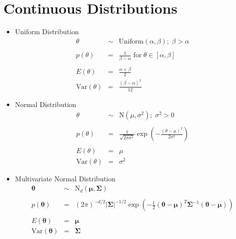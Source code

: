 \documentclass[10pt,a4paper]{article}
\begin{document}
\bigskip

\section*{Continuous Distributions}

\bigskip

\begin{itemize}
\item Uniform Distribution 
\begin{eqnarray*}
\theta &\sim& \mathrm{Uniform}(\alpha,\beta); \; \beta > \alpha \\\\
p(\theta) &=& \frac{1}{\beta - \alpha} \; \mathrm{for} \; \theta \in [\alpha,\beta] \\\\
E(\theta) &=& \frac{\alpha + \beta}{2} \\
\mathrm{Var}(\theta) &=& \frac{(\beta-\alpha)^2}{12}
\end{eqnarray*}

\bigskip

\item Normal Distribution 
\begin{eqnarray*}
\theta &\sim& \mathrm{N}(\mu, \sigma^2); \; \sigma^2 > 0 \\\\
p(\theta) &=& \frac{1}{\sqrt{2\pi\sigma^2}} \exp \left( -\frac{(\theta-\mu)^2}{2\sigma^2} \right) \\\\
E(\theta) &=& \mu \\
\mathrm{Var}(\theta) &=& \sigma^2
\end{eqnarray*}

\bigskip

\item Multivariate Normal Distribution 
\begin{eqnarray*}
\bm{\theta} &\sim& \mathrm{N}_d(\bm{\mu}, \bm{\Sigma}) \\\\
p(\bm{\theta}) &=& (2\pi)^{-d/2} \vert  \bm{\Sigma} \vert^{-1/2} \exp \left( -\frac{1}{2} (\bm{\theta} - \bm{\mu})^T \bm{\Sigma}^{-1} (\bm{\theta} - \bm{\mu}) \right)\\\\
E(\bm{\theta}) &=& \bm{\mu} \\
\mathrm{Var}(\bm{\theta}) &=& \bm{\Sigma}
\end{eqnarray*}

\bigskip


\end{itemize}
\end{document}
